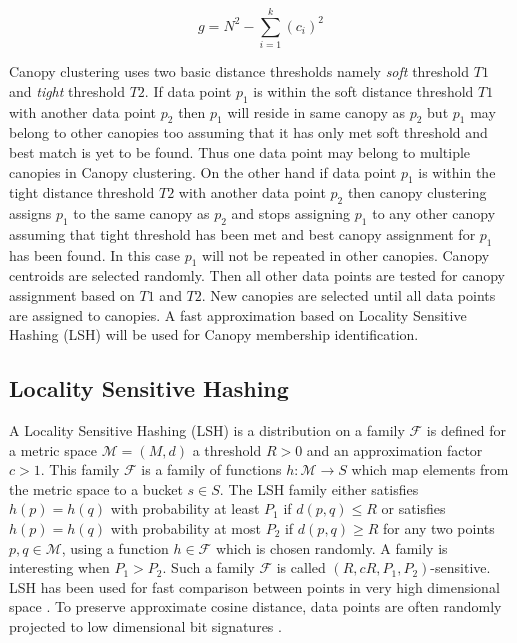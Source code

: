 \documentclass[10pt, conference, compsocconf]{IEEEtran}
\begin{document}
\begin{equation}
g=N^2-\sum_{i=1}^{k}(c_i)^2
\end{equation} 

Canopy clustering uses two basic distance thresholds namely \textit{soft} threshold $T1$ and \textit{tight} threshold $T2$. If data point $p_1$ is within the soft distance threshold $T1$ with another data point $p_2$ then $p_1$ will reside in same canopy as $p_2$ but $p_1$ may belong to other canopies too assuming that it has only met soft threshold and best match is yet to be found. Thus one data point may belong to multiple canopies in Canopy clustering. On the other hand if data point $p_1$ is within the tight distance threshold $T2$ with another data point $p_2$ then canopy clustering assigns $p_1$ to the same canopy as $p_2$ and stops assigning $p_1$ to any other canopy assuming that tight threshold has been met and best canopy assignment for $p_1$ has been found. In this case $p_1$ will not be repeated in other canopies. Canopy centroids are selected randomly. Then all other data points are tested for canopy assignment based on $T1$ and $T2$. New canopies are selected until all data points are assigned to canopies. A fast approximation based on Locality Sensitive Hashing (LSH) will be used for Canopy membership identification.


\subsection{\textbf{Locality Sensitive Hashing}}

A Locality Sensitive Hashing (LSH) \cite{MARLshRef1}\cite{MARLshRef2}\cite{MARLshRef3} is a distribution on a family ${\displaystyle {\mathcal {F}}}$ is defined for a metric space ${\displaystyle {\mathcal{M}}=(M,d)}$ a threshold ${\displaystyle R>0}$ and an approximation factor ${\displaystyle c>1}$. This family ${\displaystyle {\mathcal {F}}}$ is a family of functions ${\displaystyle h:{\mathcal {M}}\to S}$ which map elements from the metric space to a bucket ${\displaystyle s\in S}$. The LSH family either satisfies ${\displaystyle h(p)=h(q)}$ with probability at least ${\displaystyle P_{1}}$ if ${\displaystyle d(p,q)\leq R}$ or satisfies ${\displaystyle h(p)=h(q)}$ with probability at most ${\displaystyle P_{2}}$ if ${\displaystyle d(p,q)\geq R}$ for any two points ${\displaystyle p,q\in {\mathcal {M}}}$, using a function ${\displaystyle h\in {\mathcal {F}}}$ which is chosen randomly. A family is interesting when ${\displaystyle P_{1}>P_{2}}$. Such a family ${\displaystyle {\mathcal {F}}}$ is called ${\displaystyle (R,cR,P_{1},P_{2})}$-sensitive. LSH has been used for fast comparison between points in very high dimensional space \cite{MARLshRef3}. To preserve approximate cosine distance, data points are often randomly projected to low dimensional bit signatures \cite{MARLshRef4}.
\end{document}
